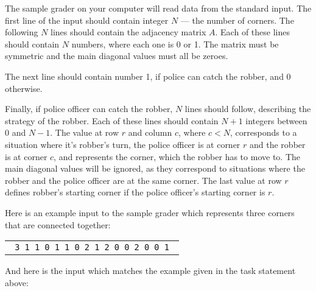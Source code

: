 \documentclass{boi2014}
\begin{document}
    \Experimentation
    The sample grader on your computer will read data from the standard input.
    The first line of the input should contain integer $N$ --- the number of
    corners.  The following $N$ lines should contain the adjacency matrix $A$.
    Each of these lines should contain $N$ numbers, where each one is 0 or 1.
    The matrix must be symmetric and the main diagonal values must all be
    zeroes.

    The next line should contain number 1, if police can catch the robber,
    and 0 otherwise.

    Finally, if police officer can catch the robber, $N$ lines should follow,
    describing the strategy of the robber.  Each of these lines should contain
    $N+1$ integers between 0 and $N-1$.  The value at row $r$ and column $c$,
    where $c < N$, corresponds to a situation where it's robber's turn, the
    police officer is at corner $r$ and the robber is at corner $c$, and
    represents the corner, which the robber has to move to.  The main diagonal
    values will be ignored, as they correspond to situations where the robber
    and the police officer are at the same corner.  The last value at row $r$
    defines robber's starting corner if the police officer's starting corner is $r$.
    
    Here is an example input to the sample grader which represents three corners
    that are connected together:

    \begin{center}
        \begin{tabular}{p{4cm}}
            {\tt
                3 \newline
                0 1 1 \newline
                1 0 1 \newline
                1 1 0 \newline
                1 \newline
                0 2 1 2 \newline
                2 0 0 2 \newline
                1 0 0 1 \newline
            }
        \end{tabular}
    \end{center}

    And here is the input which matches the example given in the task statement
    above:
\end{document}
